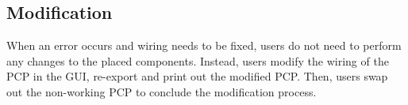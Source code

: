 \subsection{Modification} %
When an error occurs and wiring needs to be fixed, users do not need to perform any changes to the placed components. Instead, users modify the wiring of the PCP in the GUI, re-export and print out the modified PCP. Then, users swap out the non-working PCP to conclude the modification process.




